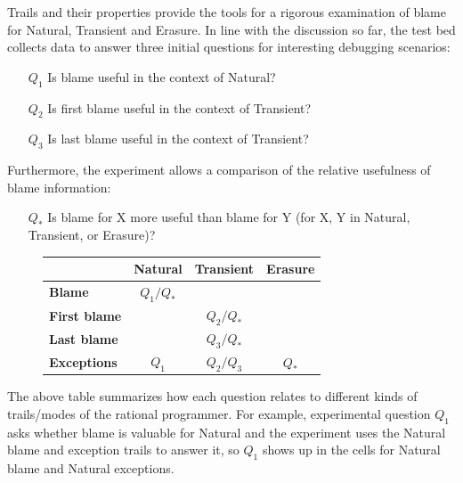 
Trails and their properties provide the tools for a rigorous examination of
blame for Natural, Transient and Erasure. In line with the discussion so far,
the test bed collects data to answer three initial questions for 
interesting debugging scenarios:
\begin{itemize}
\item[$Q_1$] Is blame useful in the context of Natural?

\item[$Q_2$] Is first blame useful in the context of Transient?

\item[$Q_3$] Is last blame useful in the context of Transient?

\end{itemize}

Furthermore, the experiment allows a comparison of the relative usefulness of blame
information:
\begin{itemize}
\item[$Q_*$] Is blame for X more useful than blame for Y (for X, Y in Natural, Transient, or Erasure)?
\end{itemize}

\begin{figure}[ht] \footnotesize
\center
{\begin{tabular}{l|c|c|c}
                        & {\bf Natural}  & {\bf Transient} &  {\bf Erasure} \\ \hline 
{\bf Blame}             &  $Q_1/Q_*$    &                  &                \\
{\bf First blame}       &               &     $Q_2/Q_*$    &                 \\
{\bf Last blame}        &               &     $Q_3/Q_*$    &                 \\
{\bf Exceptions}        &      $Q_1$    &     $Q_2/Q_3$    &      $Q_*$      \\
\end{tabular}}
  \label{fig:experiment-outline}
\end{figure}

The above table summarizes how each question relates to
different kinds of trails/modes of the rational programmer. For example,
experimental question $Q_1$ asks whether blame is valuable for Natural and the
experiment uses the Natural blame and exception trails to answer it, so $Q_1$
shows up in the cells for Natural blame and Natural exceptions.

